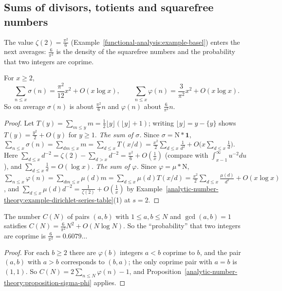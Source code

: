 \subsection{Sums of divisors, totients and squarefree numbers}\label{analytic-number-theory:subsection-totients}

The value $\zeta(2) = \frac{\pi^2}{6}$ (Example~\ref{functional-analysis:example-basel}) enters the next averages: $\frac{6}{\pi^2}$ is the density of the squarefree numbers and the probability that
two integers are coprime.

\begin{proposition}\label{analytic-number-theory:proposition-sigma-phi}
For $x \geq 2$,
\[
\sum_{n \leq x}\sigma(n) = \frac{\pi^2}{12}x^2 + O(x\log x), \qquad \sum_{n \leq x}\varphi(n) = \frac{3}{\pi^2}x^2 + O(x\log x).
\]
So on average $\sigma(n)$ is about $\frac{\pi^2}{6}n$ and $\varphi(n)$ about $\frac{6}{\pi^2}n$.
\end{proposition}

\begin{proof}
Let $T(y) = \sum_{m \leq y}m = \frac12\lfloor y\rfloor(\lfloor y\rfloor + 1)$; writing $\lfloor y\rfloor = y - \{y\}$ shows $T(y) = \frac{y^2}{2} + O(y)$ for $y \geq 1$.
\emph{The sum of $\sigma$.} Since $\sigma = \mathrm{N} * \mathbf{1}$, $\sum_{n \leq x}\sigma(n) = \sum_{dm \leq x}m = \sum_{d \leq x}T(x/d) = \frac{x^2}{2}\sum_{d \leq x}\frac1{d^2} + O\bigl(x\sum_{d \leq x}\frac1d\bigr)$.
Here $\sum_{d \leq x}d^{-2} = \zeta(2) - \sum_{d > x}d^{-2} = \frac{\pi^2}{6} + O(\frac1x)$ (compare with $\int_{x-1}^\infty u^{-2}du$), and $\sum_{d \leq x}\frac1d = O(\log x)$.
\emph{The sum of $\varphi$.} Since $\varphi = \mu * \mathrm{N}$, $\sum_{n \leq x}\varphi(n) = \sum_{dm \leq x}\mu(d)m = \sum_{d \leq x}\mu(d)T(x/d) = \frac{x^2}{2}\sum_{d \leq x}\frac{\mu(d)}{d^2} + O(x\log x)$,
and $\sum_{d \leq x}\mu(d)d^{-2} = \frac{1}{\zeta(2)} + O(\frac1x)$ by Example~\ref{analytic-number-theory:example-dirichlet-series-table}(1) at $s = 2$.
\end{proof}

\begin{corollary}\label{analytic-number-theory:corollary-coprime}
The number $C(N)$ of pairs $(a, b)$ with $1 \leq a, b \leq N$ and $\gcd(a, b) = 1$ satisfies $C(N) = \frac{6}{\pi^2}N^2 + O(N\log N)$. So the ``probability'' that two integers are coprime is
$\frac{6}{\pi^2} = 0.6079\ldots$
\end{corollary}

\begin{proof}
For each $b \geq 2$ there are $\varphi(b)$ integers $a < b$ coprime to $b$, and the pair $(a, b)$ with $a > b$ corresponds to $(b, a)$; the only coprime pair with $a = b$ is $(1, 1)$. So
$C(N) = 2\sum_{n \leq N}\varphi(n) - 1$, and Proposition~\ref{analytic-number-theory:proposition-sigma-phi} applies.
\end{proof}

